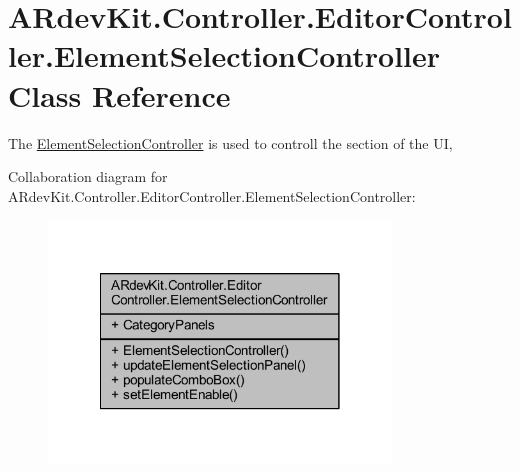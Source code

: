 \hypertarget{class_a_rdev_kit_1_1_controller_1_1_editor_controller_1_1_element_selection_controller}{\section{A\-Rdev\-Kit.\-Controller.\-Editor\-Controller.\-Element\-Selection\-Controller Class Reference}
\label{class_a_rdev_kit_1_1_controller_1_1_editor_controller_1_1_element_selection_controller}
}


The \hyperlink{class_a_rdev_kit_1_1_controller_1_1_editor_controller_1_1_element_selection_controller}{Element\-Selection\-Controller} is used to controll the section of the U\-I,  




Collaboration diagram for A\-Rdev\-Kit.\-Controller.\-Editor\-Controller.\-Element\-Selection\-Controller\-:
\nopagebreak
\begin{figure}[H]
\begin{center}
\leavevmode
\includegraphics[width=258pt]{class_a_rdev_kit_1_1_controller_1_1_editor_controller_1_1_element_selection_controller__coll__graph}
\end{center}
\end{figure}
